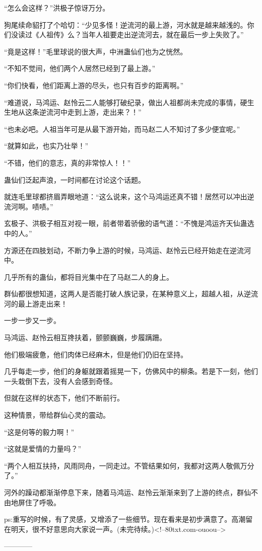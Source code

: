 \begin{this_body}
“怎么会这样？”洪极子惊讶万分。

狗尾续命貂打了个哈切：“少见多怪！逆流河的最上游，河水就是越来越浅的。你们没读过《人祖传》么？当年人祖要走出逆流河去，就在最后一步上失败了。”

“竟是这样！”毛里球说的很大声，中洲蛊仙们也为之恍然。

“不知不觉间，他们两个人居然已经到了最上游。”

“你们快看，他们距离上游的尽头，也只有百步的距离啊。”

“难道说，马鸿运、赵怜云二人能够打破纪录，做出人祖都尚未完成的事情，硬生生地从这条逆流河中走到上游，走出来？！”

“也未必吧。人祖当年可是从最下游开始，而马赵二人不知讨了多少便宜呢。”

“就算如此，也实乃壮举！”

“不错，他们的意志，真的非常惊人！！”

蛊仙们泛起声浪，一时间都在讨论这个话题。

就连毛里球都挤眉弄眼地道：“这么说来，这个马鸿运还真不错！居然可以冲出逆流河啊。啧啧。”

玄极子、洪极子相互对视一眼，前者带着骄傲的语气道：“不愧是鸿运齐天仙蛊选中的人。”

方源还在四肢划动，不断力争上游的时候，马鸿运、赵怜云已经开始走在逆流河中。

几乎所有的蛊仙，都将目光集中在了马赵二人的身上。

群仙都很想知道，这两人是否能打破人族记录，在某种意义上，超越人祖，从逆流河的最上游走出来！

一步一步又一步。

马鸿运、赵怜云相互搀扶着，颤颤巍巍，步履蹒跚。

他们极端疲惫，他们肉体已经麻木，但是他们仍旧在坚持。

几乎每走一步，他们的身躯就跟着摇晃一下，仿佛风中的柳条。若是下一刻，他们一头栽倒下去，没有人会感到奇怪。

但就在这样的状态下，他们不断前行。

这种情景，带给群仙心灵的震动。

“这是何等的毅力啊！”

“这就是爱情的力量吗？”

“两个人相互扶持，风雨同舟，一同走过。不管结果如何，我都对这两人敬佩万分了。”

河外的躁动都渐渐停息下来，随着马鸿运、赵怜云渐渐来到了上游的终点，群仙不由地屏住了呼吸。

ps:重写的时候，有了灵感，又增添了一些细节。现在看来是初步满意了。高潮留在明天，很不好意思向大家说一声。(未完待续。)<!--80txt.com-ouoou-->

------------

\end{this_body}

